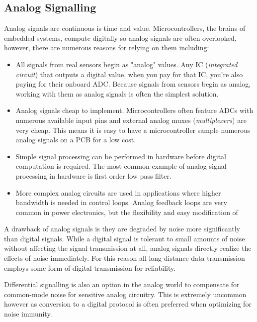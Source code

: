 \documentclass[main.tex]{subfiles}
\begin{document}
\subsection{Analog Signalling}
Analog signals are continuous is time and value. Microcontrollers, the brains of embedded systems, compute digitally so analog signals are often overlooked, however, there are numerous reasons for relying on them including: 
\begin{itemize}
    \item All signals from real sensors begin as "analog" values. Any IC (\textit{integrated circuit}) that outputs a digital value, when you pay for that IC, you're also paying for their onboard ADC. Because signals from sensors begin as analog, working with them as analog signals is often the simplest solution. 
    \item Analog signals cheap to implement. Microcontrollers often feature ADCs with numerous available input pins and external analog muxes (\textit{multiplexers}) are very cheap. This means it is easy to have a microcontroller sample numerous analog signals on a PCB for a low cost. 
    \item Simple signal processing can be performed in hardware before digital computation is required. The most common example of analog signal processing in hardware is first order low pass filter. 
    \item More complex analog circuits are used in applications where higher bandwidth is needed in control loops. Analog feedback loops are very common in power electronics, but the flexibility and easy modification of 
\end{itemize}

A drawback of analog signals is they are degraded by noise more significantly than digital signals. While a digital signal is tolerant to small amounts of noise without affecting the signal transmission at all, analog signals directly realize the effects of noise immediately. For this reason all long distance data transmission employs some form of digital transmission for reliability. 

Differential signalling is also an option in the analog world to compensate for common-mode noise for sensitive analog circuitry. This is extremely uncommon however as conversion to a digital protocol is often preferred when optimizing for noise immunity. 
\end{document}
